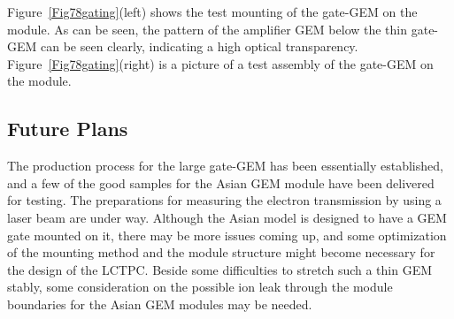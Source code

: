 Figure~\ref{Fig78gating}(left) shows the test mounting of the gate-GEM on the module. As can be seen,
the pattern of the amplifier GEM below the thin gate-GEM can be seen clearly, indicating a  high optical transparency.
Figure~\ref{Fig78gating}(right) is a picture of a test assembly of the gate-GEM on the module.

\subsection{Future Plans}

The production process for the large gate-GEM has been essentially established,
and a few of the good samples for the Asian GEM module have been delivered for testing.
The preparations for measuring the electron transmission by using a laser beam are under way.
Although the Asian model is designed to have a GEM gate mounted on it,
there may be more issues coming up, and some optimization of the mounting method and the module structure
might become necessary for the design of the LCTPC. Beside some difficulties to stretch such a thin
GEM stably, some consideration on the possible ion leak through the module boundaries
for the Asian GEM modules may be needed.
